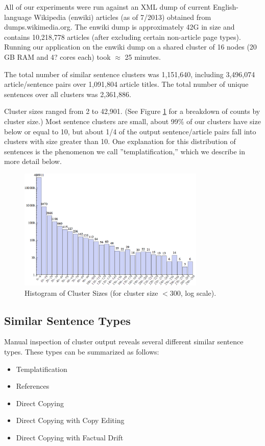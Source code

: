 \documentclass{acm_proc_article-sp}
\begin{document}
All of our experiments were run against an XML dump of current English-language Wikipedia (enwiki) articles (as of 7/2013) obtained from dumps.wikimedia.org. The enwiki dump is approximately 42G in size and contains 10,218,778 articles (after excluding certain non-article page types). Running our application on the enwiki dump on a shared cluster of 16 nodes (20 GB RAM and 4? cores each) took $\approx$ 25 minutes.

The total number of similar sentence clusters was 1,151,640, including 3,496,074 article/sentence pairs over 1,091,804 article titles. The total number of unique sentences over all clusters was 2,361,886.

Cluster sizes ranged from 2 to 42,901. (See Figure \ref{clust} for a breakdown of counts by cluster size.) Most sentence clusters are small, about 99\% of our clusters have size below or equal to 10, but about 1/4 of the output sentence/article pairs fall into clusters with size greater than 10. One explanation for this distribution of sentences is the phenomenon we call ''templatification,'' which we describe in more detail below.

\begin{figure}
\centering
\includegraphics[width=3.5in, keepaspectratio = true]{clusterhistogram.png}
\caption{Histogram of Cluster Sizes (for cluster size $< 300$, log scale).}
\label{clust}
\end{figure}

\subsection{Similar Sentence Types}

Manual inspection of cluster output reveals several different similar sentence types. These types can be summarized as follows:

\begin{itemize}
\item Templatification
\item References
\item Direct Copying
\item Direct Copying with Copy Editing
\item Direct Copying with Factual Drift
\end{itemize}
\end{document}
